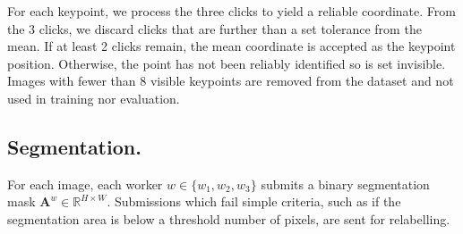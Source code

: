 For each keypoint, we process the three clicks to yield a reliable coordinate. From the 3 clicks, we discard clicks that are further than a set tolerance from the mean. If at least 2 clicks remain, the mean coordinate is accepted as the keypoint position. Otherwise, the point has not been reliably identified so is set invisible. Images with fewer than 8 visible keypoints are removed from the dataset and not used in training nor evaluation. 








\subsection{Segmentation.}

For each image, each worker $w \in \{w_{1}, w_{2}, w_{3}\}$ submits a binary segmentation mask $\mathbf{A}^{w} \in \mathbb{R}^{H \times W}$. Submissions which fail simple criteria, such as if the segmentation area is below a threshold number of pixels, are sent for relabelling. 


